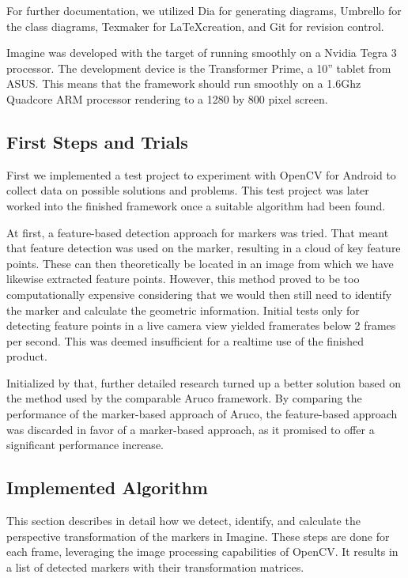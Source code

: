 For further documentation, we utilized Dia\cite{dia} for generating diagrams, Umbrello\cite{umbrello} for the class diagrams, Texmaker\cite{texmaker} for \LaTeX  creation, and Git\cite{git} for revision control.

Imagine was developed with the target of running smoothly on a Nvidia Tegra 3 processor.
The development device is the Transformer Prime, a 10'' tablet from ASUS\cite{devicedev}.
This means that the framework should run smoothly on a 1.6Ghz Quadcore ARM processor rendering to a 1280 by 800 pixel screen.

\subsection{First Steps and Trials}

First we implemented a test project to experiment with OpenCV for Android to collect data on possible solutions and problems.
This test project was later worked into the finished framework once a suitable algorithm had been found.

At first, a feature-based detection approach for markers was tried.
That meant that feature detection was used on the marker, resulting in a cloud of key feature points.
These can then theoretically be located in an image from which we have likewise extracted feature points.
However, this method proved to be too computationally expensive considering that we would then still need to identify the marker and calculate the geometric information.
Initial tests only for detecting feature points in a live camera view yielded framerates below 2 frames per second.
This was deemed insufficient for a realtime use of the finished product.

Initialized by that, further detailed research turned up a better solution based on the method used by the comparable Aruco\cite{aruco} framework.
By comparing the performance of the marker-based approach of Aruco, the feature-based approach was discarded in favor of a marker-based approach, as it promised to offer a significant performance increase.

\subsection{Implemented Algorithm}
\label{detection_workflow}

This section describes in detail how we detect, identify, and calculate the perspective transformation of the markers in Imagine.
These steps are done for each frame, leveraging the image processing capabilities of OpenCV.
It results in a list of detected markers with their transformation matrices.

